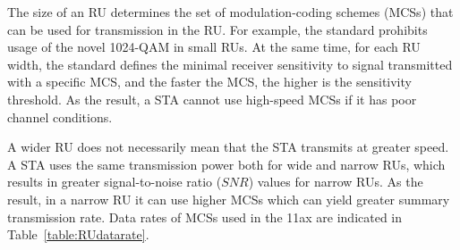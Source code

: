 The size of an RU determines the set of modulation-coding schemes (MCSs) that can be used for transmission in the RU.
For example, the standard prohibits usage of the novel 1024-QAM in small RUs.
At the same time, for each RU width, the standard defines the minimal receiver sensitivity to signal transmitted with a specific MCS, and the faster the MCS, the higher is the sensitivity threshold.
As the result, a STA cannot use high-speed MCSs if it has poor channel conditions.

\begin{table}[t]
	{\centering
		\caption{\label{table:RUdatarate} Data rate in different RU at each MCS in Mbps}
	}
\end{table}		

A wider RU does not necessarily mean that the STA transmits at greater speed.
A STA uses the same transmission power both for wide and narrow RUs, which results in greater signal-to-noise ratio ($SNR$) values for narrow RUs.
As the result, in a narrow RU it can use higher MCSs which can yield greater summary transmission rate. 
Data rates of MCSs used in the 11ax are indicated in Table~\ref{table:RUdatarate}. 

